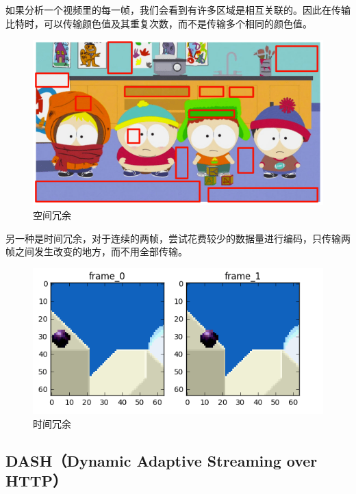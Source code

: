 如果分析一个视频里的每一帧，我们会看到有许多区域是相互关联的。因此在传输比特时，可以传输颜色值及其重复次数，而不是传输多个相同的颜色值。\\

\begin{figure}[H]
    \centering
    \includegraphics[scale=0.7]{img/C2/2-7/1.png}
    \caption{空间冗余}
\end{figure}

另一种是时间冗余，对于连续的两帧，尝试花费较少的数据量进行编码，只传输两帧之间发生改变的地方，而不用全部传输。\\

\begin{figure}[H]
    \centering
    \includegraphics[scale=0.7]{img/C2/2-7/2.png}
    \caption{时间冗余}
\end{figure}

\vspace{0.5cm}

\subsection{DASH（Dynamic Adaptive Streaming over HTTP）}


